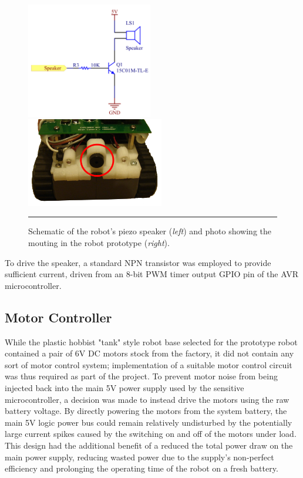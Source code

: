 \begin{figure}[h]
	\centering
		\includegraphics[width=55mm]{./Figures/SpeakerSchematic.png}
		\includegraphics[width=60mm]{./Figures/RobotFront.png}
	\rule{35em}{0.5pt}
	\caption[Speaker Schematic and Mouting Photo]{Schematic of the robot's piezo speaker (\textit{left}) and photo showing the mouting in the robot prototype (\textit{right}).}
	\label{fig:robotspeaker}
\end{figure}

To drive the speaker, a standard NPN transistor was employed to provide sufficient current, driven from an 8-bit PWM timer output GPIO pin of the AVR microcontroller.

\subsection{Motor Controller}

While the plastic hobbist "tank" style robot base selected for the prototype robot contained a pair of 6V DC motors stock from the factory, it did not contain any sort of motor control system; implementation of a suitable motor control circuit was thus required as part of the project. To prevent motor noise from being injected back into the main 5V power supply used by the sensitive microcontroller, a decision was made to instead drive the motors using the raw battery voltage. By directly powering the motors from the system battery, the main 5V logic power bus could remain relatively undisturbed by the potentially large current spikes caused by the switching on and off of the motors under load. This design had the additional benefit of a reduced the total power draw on the main power supply, reducing wasted power due to the supply's non-perfect efficiency and prolonging the operating time of the robot on a fresh battery.

